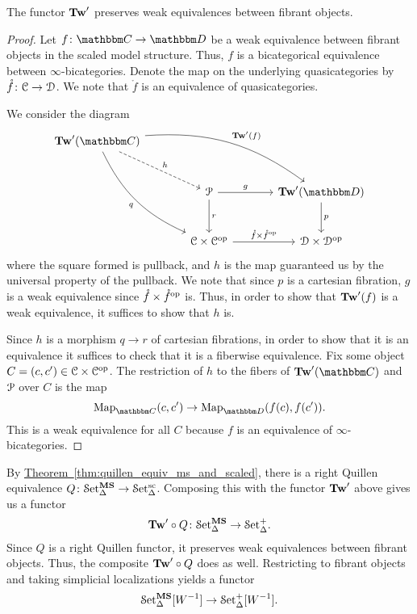\documentclass[main.tex]{subfiles}
\begin{document}
\begin{lemma}
  The functor $\mathbf{Tw}'$ preserves weak equivalences between fibrant objects.
\end{lemma}
\begin{proof}
  Let $f\colon \CC \to \DD$ be a weak equivalence between fibrant objects in the scaled model structure. Thus, $f$ is a bicategorical equivalence between $\infty$-bicategories. Denote the map on the underlying quasicategories by $\mathring{f}\colon \mathcal{C} \to \mathcal{D}$. We note that $\mathring{f}$ is an equivalence of quasicategories.

  We consider the diagram
  \begin{equation*}
    \begin{tikzcd}[row sep=large, column sep=large]
      \Tw'(\CC)
      \arrow[drr, bend left=20, "\Tw'(f)"]
      \arrow[ddr, bend right=20, swap, "q"]
      \arrow[dr, dashed, "h"]
      \\
      & \mathcal{P}
      \arrow[r, "g"]
      \arrow[d, "r"]
      & \Tw'(\DD)
      \arrow[d, "p"]
      \\
      & \category{C} \times \category{C}\op
      \arrow[r, "\mathring{f} \times \mathring{f}\op"]
      & \category{D} \times \category{D}\op
    \end{tikzcd}
  \end{equation*}
  where the square formed is pullback, and $h$ is the map guaranteed us by the universal property of the pullback. We note that since $p$ is a cartesian fibration, $g$ is a weak equivalence since $\mathring{f} \times \mathring{f}^{\mathrm{op}}$ is. Thus, in order to show that $\mathbf{Tw}'(f)$ is a weak equivalence, it suffices to show that $h$ is.

  Since $h$ is a morphism $q \to r$ of cartesian fibrations, in order to show that it is an equivalence it suffices to check that it is a fiberwise equivalence. Fix some object $C = (c, c') \in \mathcal{C} \times \mathcal{C}^{\mathrm{op}}$. The restriction of $h$ to the fibers of $\Tw'(\CC)$ and $\mathcal{P}$ over $C$ is the map
  \begin{equation*}
    \Map_{\CC}(c, c') \to \Map_{\DD}(f(c), f(c')).
  \end{equation*}
  This is a weak equivalence for all $C$ because $f$ is an equivalence of $\infty$-bicategories.
\end{proof}

By \hyperref[thm:quillen_equiv_ms_and_scaled]{Theorem~\ref*{thm:quillen_equiv_ms_and_scaled}}, there is a right Quillen equivalence $Q\colon \mathcal{S}\mathrm{et}_{\Delta}^{\mathbf{MS}} \to \mathcal{S}\mathrm{et}_{\Delta}^{\mathrm{sc}}$. Composing this with the functor $\mathbf{Tw}'$ above gives us a functor
\begin{equation*}
  \mathbf{Tw}' \circ Q\colon \mathcal{S}\mathrm{et}_{\Delta}^{\mathbf{MS}} \to \mathcal{S}\mathrm{et}_{\Delta}^{+}.
\end{equation*}
Since $Q$ is a right Quillen functor, it preserves weak equivalences between fibrant objects. Thus, the composite $\mathbf{Tw}' \circ Q$ does as well. Restricting to fibrant objects and taking simplicial localizations yields a functor
\begin{equation*}
  \mathcal{S}\mathrm{et}_{\Delta}^{\mathbf{MS}}[W^{-1}] \to \mathcal{S}\mathrm{et}_{\Delta}^{+}[W^{-1}].
\end{equation*}
\end{document}
